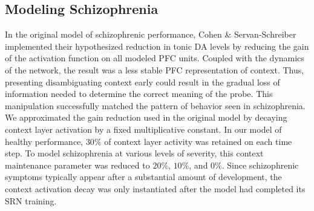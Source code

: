 \subsection{Modeling Schizophrenia}
In the original model of schizophrenic performance, Cohen \& Servan-Schreiber implemented their hypothesized reduction in tonic DA levels by reducing the gain of the activation function on all modeled PFC units. Coupled with the dynamics of the network, the result was a less stable PFC representation of context. Thus, presenting disambiguating context early could result in the gradual loss of information needed to determine the correct meaning of the probe. This manipulation successfully matched the pattern of behavior seen in schizophrenia. We approximated the gain reduction used in the original model by decaying context layer activation by a fixed multiplicative constant. In our model of healthy performance, $30\%$ of context layer activity was retained on each time step. To model schizophrenia at various levels of severity, this context maintenance parameter was reduced to $20\%$, $10\%$, and $0\%$. Since schizophrenic symptoms typically appear after a substantial amount of development, the context activation decay was only instantiated after the model had completed its SRN training.

